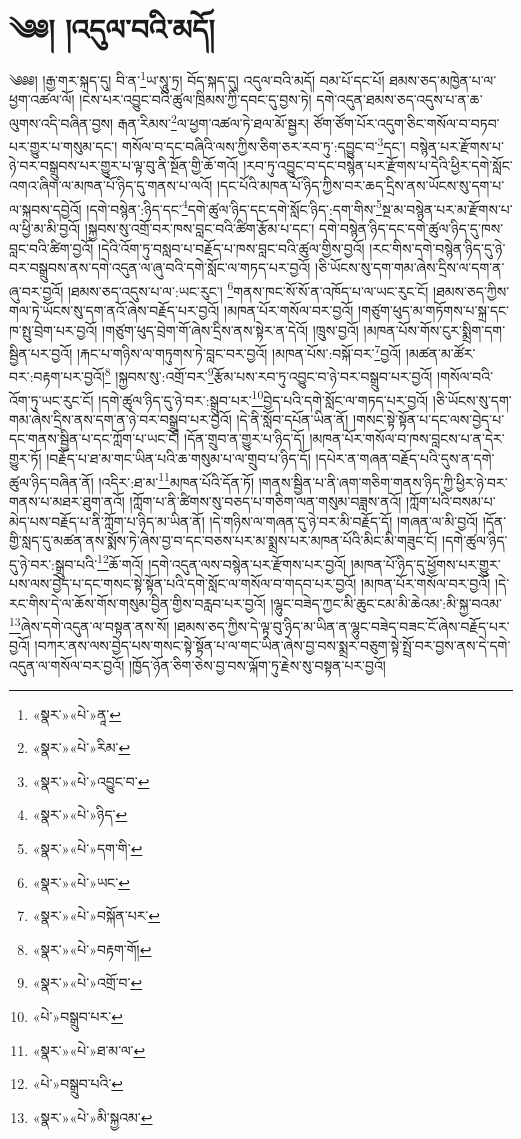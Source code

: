 \chapter{༄༅། །འདུལ་བའི་མདོ།}༄༅༅། །རྒྱ་གར་སྐད་དུ། བི་ན་\footnote{«སྣར་»«པེ་»ནཱ་}ཡ་སཱུ་ཏྲ། བོད་སྐད་དུ། འདུལ་བའི་མདོ། བམ་པོ་དང་པོ། ཐམས་ཅད་མཁྱེན་པ་ལ་ཕྱག་འཚལ་ལོ། །ངེས་པར་འབྱུང་བའི་ཚུལ་ཁྲིམས་ཀྱི་དབང་དུ་བྱས་ཏེ། དགེ་འདུན་ཐམས་ཅད་འདུས་པ་ན་ཆ་ལུགས་འདི་བཞིན་བྱས། རྒན་རིམས་\footnote{«སྣར་»«པེ་»རིམ་}ལ་ཕྱག་འཚལ་ཏེ་ཐལ་མོ་སྦྱར། ཙོག་ཙོག་པོར་འདུག་ཅིང་གསོལ་བ་བཏབ་པར་གྱུར་པ་གསུམ་དང་། གསོལ་བ་དང་བཞིའི་ལས་ཀྱིས་ཅིག་ཅར་རབ་ཏུ་:དབྱུང་བ་\footnote{«སྣར་»«པེ་»འབྱུང་བ་}དང་། བསྙེན་པར་རྫོགས་པ་ཉེ་བར་བསྒྲུབས་པར་གྱུར་པ་ལྟ་བུ་ནི་སྔོན་གྱི་ཆོ་གའོ། །རབ་ཏུ་འབྱུང་བ་དང་བསྙེན་པར་རྫོགས་པ་དེའི་ཕྱིར་དགེ་སློང་འགའ་ཞིག་ལ་མཁན་པོ་ཉིད་དུ་གནས་པ་ལའོ། །དང་པོའི་མཁན་པོ་ཉིད་ཀྱིས་བར་ཆད་དྲིས་ནས་ཡོངས་སུ་དག་པ་ལ་སྐབས་དབྱེའོ། །དགེ་བསྙེན་:ཉིད་དང་\footnote{«སྣར་»«པེ་»ཉིད་}དགེ་ཚུལ་ཉིད་དང་དགེ་སློང་ཉིད་:དག་གིས་\footnote{«སྣར་»«པེ་»དག་གི་}སྔ་མ་བསྙེན་པར་མ་རྫོགས་པ་ལ་ཕྱི་མ་མི་བྱའོ། །སྐྱབས་སུ་འགྲོ་བར་ཁས་བླང་བའི་ཚིག་རྩོམ་པ་དང་། དགེ་བསྙེན་ཉིད་དང་དགེ་ཚུལ་ཉིད་དུ་ཁས་བླང་བའི་ཚིག་བྱའོ། །དེའི་འོག་ཏུ་བསླབ་པ་བརྗོད་པ་ཁས་བླང་བའི་ཚུལ་གྱིས་བྱའོ། །རང་གིས་དགེ་བསྙེན་ཉིད་དུ་ཉེ་བར་བསྒྲུབས་ནས་དགེ་འདུན་ལ་ཞུ་བའི་དགེ་སློང་ལ་གཏད་པར་བྱའོ། །ཅི་ཡོངས་སུ་དག་གམ་ཞེས་དྲིས་ལ་དག་ན་ཞུ་བར་བྱའོ། །ཐམས་ཅད་འདུས་པ་ལ་:ཡང་རུང་། \footnote{«སྣར་»«པེ་»ཡང་}གནས་ཁང་སོ་སོ་ན་འཁོད་པ་ལ་ཡང་རུང་ངོ། །ཐམས་ཅད་ཀྱིས་གལ་ཏེ་ཡོངས་སུ་དག་ནའོ་ཞེས་བརྗོད་པར་བྱའོ། །མཁན་པོར་གསོལ་བར་བྱའོ། །གཙུག་ཕུད་མ་གཏོགས་པ་སྐྲ་དང་ཁ་སྤུ་བྲེག་པར་བྱའོ། །གཙུག་ཕུད་བྲེག་གོ་ཞེས་དྲིས་ནས་སྟེར་ན་དེའོ། །ཁྲུས་བྱའོ། །མཁན་པོས་གོས་ངུར་སྨྲིག་དག་སྦྱིན་པར་བྱའོ། །རྐང་པ་གཉིས་ལ་གཏུགས་ཏེ་བླང་བར་བྱའོ། །མཁན་པོས་:བསྐོ་བར་\footnote{«སྣར་»«པེ་»བསྐོན་པར་}བྱའོ། །མཚན་མ་ཚོར་བར་:བརྟག་པར་བྱའོ།\footnote{«སྣར་»«པེ་»བརྟག་གོ།} །སྐྱབས་སུ་:འགྲོ་བར་\footnote{«སྣར་»«པེ་»འགྲོ་བ་}རྩོམ་པས་རབ་ཏུ་འབྱུང་བ་ཉེ་བར་བསྒྲུབ་པར་བྱའོ། །གསོལ་བའི་འོག་ཏུ་ཡང་རུང་ངོ། །དགེ་ཚུལ་ཉིད་དུ་ཉེ་བར་:སྒྲུབ་པར་\footnote{«པེ་»བསྒྲུབ་པར་}བྱེད་པའི་དགེ་སློང་ལ་གཏད་པར་བྱའོ། །ཅི་ཡོངས་སུ་དག་གམ་ཞེས་དྲིས་ནས་དག་ན་ཉེ་བར་བསྒྲུབ་པར་བྱའོ། །དེ་ནི་སློབ་དཔོན་ཡིན་ནོ། །གསང་སྟེ་སྟོན་པ་དང་ལས་བྱེད་པ་དང་གནས་སྦྱིན་པ་དང་ཀློག་པ་ཡང་ངོ། །དོན་གྲུབ་ན་གྱུར་པ་ཉིད་དོ། །མཁན་པོར་གསོལ་བ་ཁས་བླངས་པ་ན་དེར་གྱུར་ཏོ། །བརྗོད་པ་ཐ་མ་གང་ཡིན་པའི་ཆ་གསུམ་པ་ལ་གྲུབ་པ་ཉིད་དོ། །དཔེར་ན་གཞན་བརྗོད་པའི་དུས་ན་དགེ་ཚུལ་ཉིད་བཞིན་ནོ། །འདིར་:ཐ་མ་\footnote{«སྣར་»«པེ་»ཐ་མ་ལ་}མཁན་པོའི་དོན་ཏོ། །གནས་སྦྱིན་པ་ནི་ཞག་གཅིག་གནས་ཉིད་ཀྱི་ཕྱིར་ཉེ་བར་གནས་པ་མཐར་ཐུག་ནའོ། །ཀློག་པ་ནི་ཚིགས་སུ་བཅད་པ་གཅིག་ལན་གསུམ་བཟླས་ནའོ། །ཀློག་པའི་བསམ་པ་མེད་པས་བརྗོད་པ་ནི་ཀློག་པ་ཉིད་མ་ཡིན་ནོ། །དེ་གཉིས་ལ་གཞན་དུ་ཉེ་བར་མི་བརྗོད་དོ། །གཞན་ལ་མི་བྱའོ། །དོན་གྱི་སླད་དུ་མཚན་ནས་སྨོས་ཏེ་ཞེས་བྱ་བ་དང་བཅས་པར་མ་སྨྲས་པར་མཁན་པོའི་མིང་མི་གཟུང་ངོ། །དགེ་ཚུལ་ཉིད་དུ་ཉེ་བར་:སྒྲུབ་པའི་\footnote{«པེ་»བསྒྲུབ་པའི་}ཆོ་གའོ། །དགེ་འདུན་ལས་བསྙེན་པར་རྫོགས་པར་བྱའོ། །མཁན་པོ་ཉིད་དུ་ཕྱོགས་པར་གྱུར་པས་ལས་བྱེད་པ་དང་གསང་སྟེ་སྟོན་པའི་དགེ་སློང་ལ་གསོལ་བ་གདབ་པར་བྱའོ། །མཁན་པོར་གསོལ་བར་བྱའོ། །དེ་རང་གིས་དེ་ལ་ཆོས་གོས་གསུམ་བྱིན་གྱིས་བརླབ་པར་བྱའོ། །ལྷུང་བཟེད་ཀྱང་མི་ཆུང་ངམ་མི་ཆེའམ་:མི་སྐྱ་བའམ་\footnote{«སྣར་»«པེ་»མི་སྐྱའམ་}ཞེས་དགེ་འདུན་ལ་བསྟན་ནས་སོ། །ཐམས་ཅད་ཀྱིས་དེ་ལྟ་བུ་ཉིད་མ་ཡིན་ན་ལྷུང་བཟེད་བཟང་ངོ་ཞེས་བརྗོད་པར་བྱའོ། །བཀར་ནས་ལས་བྱེད་པས་གསང་སྟེ་སྟོན་པ་ལ་གང་ཡིན་ཞེས་བྱ་བས་སྨྲར་བཅུག་སྟེ་སྤྲོ་བར་བྱས་ནས་དེ་དགེ་འདུན་ལ་གསོལ་བར་བྱའོ། །ཁྱོད་ཉོན་ཅིག་ཅེས་བྱ་བས་ལྐོག་ཏུ་རྗེས་སུ་བསྟན་པར་བྱའོ། 